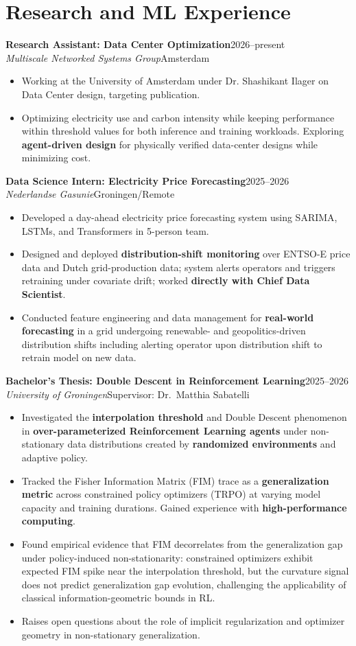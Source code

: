 \documentclass[10pt,a4paper]{article}
\newcommand{\cvheading}[4]{\textbf{#1}\hfill #2\\\emph{#3}\hfill #4\par}
\begin{document}
\section*{Research and ML Experience}
\cvheading{Research Assistant: Data Center Optimization}{2026--present}{Multiscale Networked Systems Group}{Amsterdam}
\begin{itemize}
    \item Working at the University of Amsterdam under Dr. Shashikant Ilager on Data Center design, targeting publication.
    \item Optimizing electricity use and carbon intensity while keeping performance within threshold values for both inference and training workloads. Exploring \textbf{agent-driven design} for physically verified data-center designs while minimizing cost.
\end{itemize}
\cvheading{Data Science Intern: Electricity Price Forecasting}{2025--2026}{Nederlandse Gasunie}{Groningen/Remote}
\begin{itemize}
    \item Developed a day-ahead electricity price forecasting system using SARIMA, LSTMs, and Transformers in 5-person team. %
    \item Designed and deployed \textbf{distribution-shift monitoring} over ENTSO-E price data and Dutch grid-production data; system alerts operators and triggers retraining under covariate drift; worked \textbf{directly with Chief Data Scientist}.
    \item Conducted feature engineering and data management for \textbf{real-world forecasting} in a grid undergoing renewable- and geopolitics-driven distribution shifts including alerting operator upon distribution shift to retrain model on new data.
\end{itemize}
\cvheading{Bachelor's Thesis: Double Descent in Reinforcement Learning}{2025--2026}{University of Groningen}{Supervisor: Dr.\ Matthia Sabatelli}
\begin{itemize}
    \item Investigated the \textbf{interpolation threshold} and Double Descent phenomenon in \textbf{over-parameterized Reinforcement Learning agents} under non-stationary data distributions created by \textbf{randomized environments} and adaptive policy.
    \item Tracked the Fisher Information Matrix (FIM) trace as a \textbf{generalization metric} across constrained policy optimizers (TRPO) at varying model capacity and training durations. Gained experience with \textbf{high-performance computing}.
    \item Found empirical evidence that FIM decorrelates from the generalization gap under policy-induced non-stationarity: constrained optimizers exhibit expected FIM spike near the interpolation threshold, but the curvature signal does not predict generalization gap evolution, challenging the applicability of classical information-geometric bounds in RL.
    \item Raises open questions about the role of implicit regularization and optimizer geometry in non-stationary generalization.
\end{itemize}
\end{document}
